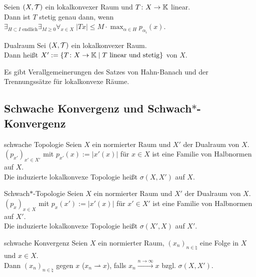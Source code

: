\begin{Kor}
    Seien $(X, \mathcal{T})$ ein lokalkonvexer Raum und $T\colon X \rightarrow \mathbb{K}$ linear.\\
    Dann ist $T$ stetig genau dann, wenn
    $\exists_{H \subset I \text{ endlich}} \exists_{M \ge 0}
    \forall_{x \in X}\; |Tx| \le M \cdot \max_{\alpha \in H} p_{\alpha_i}(x)$.
\end{Kor}

\begin{Def}{Dualraum}
    Sei $(X, \mathcal{T})$ ein lokalkonvexer Raum.\\
    Dann heißt $X' := \{T\colon X \rightarrow \mathbb{K} \;|\; T \text{ linear und stetig}\}$
     von $X$.
\end{Def}

\begin{Bem}
    Es gibt Verallgemeinerungen des Satzes von Hahn-Banach und der Trennungssätze
    für lokalkonvexe Räume.
\end{Bem}

\pagebreak

\subsection{%
    Schwache Konvergenz und \texorpdfstring{Schwach$\ast$}{Schwach*}-Konvergenz%
}

\begin{Def}{schwache Topologie}
    Seien $X$ ein normierter Raum und $X'$ der Dualraum von $X$.\\
    $(p_{x'})_{x' \in X'}$ mit $p_{x'}(x) := |x'(x)|$ für $x \in X$ ist eine Familie von
    Halbnormen auf $X$.\\
    Die induzierte lokalkonvexe Topologie heißt 
    $\sigma(X, X')$ auf $X$.
\end{Def}

\begin{Def}{Schwach$\ast$-Topologie}
    Seien $X$ ein normierter Raum und $X'$ der Dualraum von $X$.\\
    $(p_x)_{x \in X}$ mit $p_x(x') := |x'(x)|$ für $x' \in X'$ ist eine Familie von
    Halbnormen auf $X'$.\\
    Die induzierte lokalkonvexe Topologie heißt 
    $\sigma(X', X)$ auf $X'$.
\end{Def}

\begin{Def}{schwache Konvergenz}
    Seien $X$ ein normierter Raum, $(x_n)_{n \in \natural}$ eine Folge in $X$ und $x \in X$.\\
    Dann  $(x_n)_{n \in \natural}$  gegen $x$
    ($x_n \rightharpoonup x$), falls
    $x_n \xrightarrow{n \to \infty} x$ bzgl. $\sigma(X, X')$.
\end{Def}

